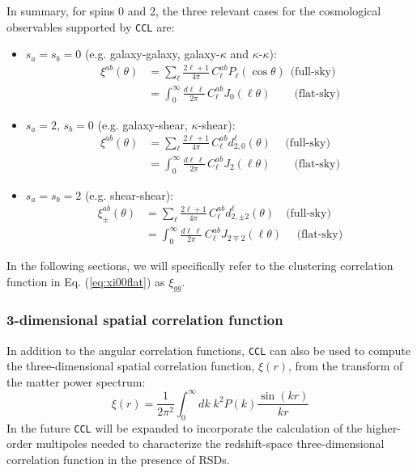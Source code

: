 \documentclass[\docopts]{\docclass}
\newcommand{\ccl}{{\tt CCL}\xspace}
\begin{document}
In summary, for spins 0 and 2, the three relevant cases for the cosmological observables supported by \ccl are:
\begin{itemize}
  \item $s_a=s_b=0$ (e.g. galaxy-galaxy, galaxy-$\kappa$ and $\kappa$-$\kappa$):
    \begin{align}\label{eq:xi00full}
      \xi^{ab}(\theta)&=\sum_\ell\frac{2\ell+1}{4\pi}\,C^{ab}_\ell P_\ell(\cos\theta)\hspace{5pt}\text{(full-sky)}\\\label{eq:xi00flat}
                      &=\int_0^\infty\frac{d\ell\,\ell}{2\pi}\,C^{ab}_\ell J_0(\ell\theta)\hspace{25pt}\text{(flat-sky)}
    \end{align}
  \item $s_a=2$, $s_b=0$ (e.g. galaxy-shear, $\kappa$-shear):
    \begin{align}\label{eq:xi02full}
      \xi^{ab}(\theta)&=\sum_\ell\frac{2\ell+1}{4\pi}\,C^{ab}_\ell d^\ell_{2,0}(\theta)\hspace{15pt}\text{(full-sky)}\\\label{eq:xi02flat}
                      &=\int_0^\infty\frac{d\ell\,\ell}{2\pi}\,C^{ab}_\ell J_2(\ell\theta)\hspace{25pt}\text{(flat-sky)}
    \end{align}
  \item $s_a=s_b=2$ (e.g. shear-shear):
    \begin{align}\label{eq:xi22full}
      \xi^{ab}_\pm(\theta)&=\sum_\ell\frac{2\ell+1}{4\pi}\,C^{ab}_\ell d^\ell_{2,\pm2}(\theta)\hspace{12pt}\text{(full-sky)}\\\label{eq:xi22flat}
                      &=\int_0^\infty\frac{d\ell\,\ell}{2\pi}\,C^{ab}_\ell J_{2\mp2}(\ell\theta)\hspace{16pt}\text{(flat-sky)}
    \end{align}
\end{itemize}
In the following sections, we will specifically refer to the clustering correlation function in Eq. (\ref{eq:xi00flat}) as $\xi_{gg}$.

\subsubsection{3-dimensional spatial correlation function}
In addition to the angular correlation functions, \ccl can also be used to compute the three-dimensional spatial correlation function, $\xi(r)$, from the transform of the matter power spectrum:
\begin{equation}
\xi(r) = \frac{1}{2 \pi^2} \int_0^\infty dk \; k^2 P(k) \frac{\sin(kr)}{kr}
\label{eq:xi3d}
\end{equation}
In the future \ccl will be expanded to incorporate the calculation of the higher-order multipoles needed to characterize the redshift-space three-dimensional correlation function in the presence of RSDs.
\end{document}
